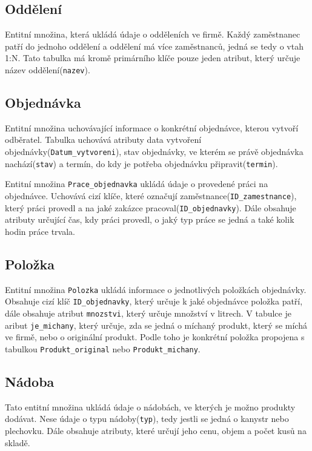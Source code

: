 \subsection{Oddělení}

Entitní množina, která ukládá údaje o odděleních ve firmě. Každý zaměstnanec patří do jednoho oddělení a oddělení má více zaměstnanců, jedná se tedy o vtah 1:N. Tato tabulka má kromě primárního klíče pouze jeden atribut, který určuje název oddělení(\texttt{nazev}).

\subsection{Objednávka}

Entitní množina uchovávající informace o konkrétní objednávce, kterou vytvoří odběratel. Tabulka uchovává atributy data vytvoření objednávky(\texttt{Datum\_vytvoreni}), stav objednávky, ve kterém se právě objednávka nachází(\texttt{stav}) a termín, do kdy je potřeba objednávku připravit(\texttt{termin}).

Entitní množina \texttt{Prace\_objednavka} ukládá údaje o provedené práci na objednávce. Uchovává cizí klíče, které označují zaměstnance(\texttt{ID\_zamestnance}), který práci provedl a na jaké zakázce pracoval(\texttt{ID\_objednavky}). Dále obsahuje atributy určující čas, kdy práci provedl, o jaký typ práce se jedná a také kolik hodin práce trvala.

\subsection{Položka}
Entitní množina \texttt{Polozka} ukládá informace o jednotlivých položkách objednávky. Obsahuje cizí klíč \texttt{ID\_objednavky}, který určuje k jaké objednávce položka patří, dále obsahuje atribut \texttt{mnozstvi}, který určuje množství v litrech. V tabulce je aribut \texttt{je\_michany}, který určuje, zda se jedná o míchaný produkt, který se míchá ve firmě, nebo o originální produkt. Podle toho je konkrétní položka propojena s tabulkou \texttt{Produkt\_original} nebo \texttt{Produkt\_michany}.


\subsection{Nádoba}

Tato entitní množina ukládá údaje o nádobách, ve kterých je možno produkty dodávat. Nese údaje o typu nádoby(\texttt{typ}), tedy jestli se jedná  o kanystr nebo plechovku. Dále obsahuje atributy, které určují jeho cenu, objem a počet kusů na skladě.

